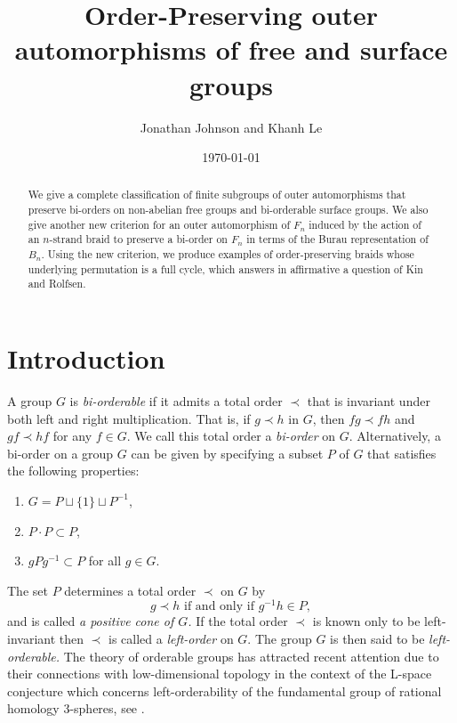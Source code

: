 \documentclass{amsart}
\title{Order-Preserving outer automorphisms of free and surface groups}
\author{Jonathan Johnson and Khanh Le}
\date{\today}
\begin{document}
\begin{abstract}
We give a complete classification of finite subgroups of outer automorphisms that preserve bi-orders on non-abelian free groups and bi-orderable surface groups. We also give another new criterion for an outer automorphism of $F_n$ induced by the action of an $n$-strand braid to preserve a bi-order on $F_n$ in terms of the Burau representation of $B_n$. Using the new criterion, we produce examples of order-preserving braids whose underlying permutation is a full cycle, which answers in affirmative a question of Kin and Rolfsen. 
\end{abstract}

\maketitle


\section{Introduction}
A group $G$ is \emph{bi-orderable} if it admits a total order $\prec$ that is invariant under both left and right multiplication. That is, if $g \prec h$ in $G$, then $fg \prec fh$ and $gf \prec hf$ for any $f\in G$. We call this total order a \emph{bi-order} on $G$. Alternatively, a bi-order on a group $G$ can be given by specifying a subset $P$ of $G$ that satisfies the following properties:
\begin{enumerate}
    \item $G = P \sqcup \{1\} \sqcup P^{-1}$,
    \item $P \cdot P \subset P$,
    \item $gPg^{-1} \subset P$ for all $g \in G$.
\end{enumerate}
The set $P$ determines a total order $\prec$ on $G$ by 
\[
g \prec h \text{ if and only if } g^{-1}h \in P,
\]
and is called \emph{a positive cone of $G$.} If the total order $\prec$ is known only to be left-invariant then $\prec$ is called a \emph{left-order} on $G$. The group $G$ is then said to be \emph{left-orderable.} The theory of orderable groups has attracted recent attention due to their connections with low-dimensional topology in the context of the L-space conjecture which concerns left-orderability of the fundamental group of rational homology 3-spheres, see \cite{BoyerGordonWatson13, Juhasz15}. 
\end{document}
